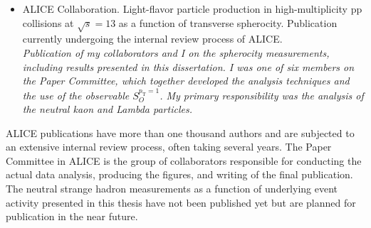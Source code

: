 \documentclass{article}
\begin{document}
\begin{itemize}
\item ALICE Collaboration. Light-flavor particle production in high-multiplicity pp collisions at $\sqrt{s}=13$ as a function of transverse spherocity. Publication currently undergoing the internal review process of ALICE. \\\textit{Publication of my collaborators and I on the spherocity measurements, including results presented in this dissertation. I was one of six members on the Paper Committee, which together developed the analysis techniques and the use of the observable $S_O^{p_\mathrm{T}=1}$. My primary responsibility was the analysis of the neutral kaon and Lambda particles.}

\end{itemize}

ALICE publications have more than one thousand authors and are subjected to an extensive internal review process, often taking several years.
The Paper Committee in ALICE is the group of collaborators responsible for conducting the actual data analysis, producing the figures, and writing of the final publication.
The neutral strange hadron measurements as a function of underlying event activity presented in this thesis have not been published yet but are planned for publication in the near future.
\end{document}
